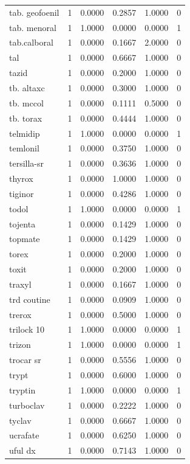 \begin{longtable}{p{3.0cm}rrrrr}
tab. geofoenil & 1 & 0.0000 & 0.2857 & 1.0000 & 0 \\
tab. menoral & 1 & 1.0000 & 0.0000 & 0.0000 & 1 \\
tab.calboral & 1 & 0.0000 & 0.1667 & 2.0000 & 0 \\
tal & 1 & 0.0000 & 0.6667 & 1.0000 & 0 \\
tazid & 1 & 0.0000 & 0.2000 & 1.0000 & 0 \\
tb. altaxc & 1 & 0.0000 & 0.3000 & 1.0000 & 0 \\
tb. mccol & 1 & 0.0000 & 0.1111 & 0.5000 & 0 \\
tb. torax & 1 & 0.0000 & 0.4444 & 1.0000 & 0 \\
telmidip & 1 & 1.0000 & 0.0000 & 0.0000 & 1 \\
temlonil & 1 & 0.0000 & 0.3750 & 1.0000 & 0 \\
tersilla-sr & 1 & 0.0000 & 0.3636 & 1.0000 & 0 \\
thyrox & 1 & 0.0000 & 1.0000 & 1.0000 & 0 \\
tiginor & 1 & 0.0000 & 0.4286 & 1.0000 & 0 \\
todol & 1 & 1.0000 & 0.0000 & 0.0000 & 1 \\
tojenta & 1 & 0.0000 & 0.1429 & 1.0000 & 0 \\
topmate & 1 & 0.0000 & 0.1429 & 1.0000 & 0 \\
torex & 1 & 0.0000 & 0.2000 & 1.0000 & 0 \\
toxit & 1 & 0.0000 & 0.2000 & 1.0000 & 0 \\
traxyl & 1 & 0.0000 & 0.1667 & 1.0000 & 0 \\
trd coutine & 1 & 0.0000 & 0.0909 & 1.0000 & 0 \\
trerox & 1 & 0.0000 & 0.5000 & 1.0000 & 0 \\
trilock 10 & 1 & 1.0000 & 0.0000 & 0.0000 & 1 \\
trizon & 1 & 1.0000 & 0.0000 & 0.0000 & 1 \\
trocar sr & 1 & 0.0000 & 0.5556 & 1.0000 & 0 \\
trypt & 1 & 0.0000 & 0.6000 & 1.0000 & 0 \\
tryptin & 1 & 1.0000 & 0.0000 & 0.0000 & 1 \\
turboclav & 1 & 0.0000 & 0.2222 & 1.0000 & 0 \\
tyclav & 1 & 0.0000 & 0.6667 & 1.0000 & 0 \\
ucrafate & 1 & 0.0000 & 0.6250 & 1.0000 & 0 \\
uful dx & 1 & 0.0000 & 0.7143 & 1.0000 & 0 \\

\end{longtable}
